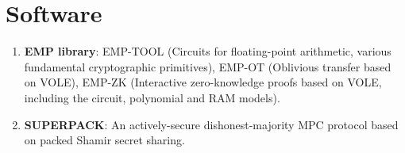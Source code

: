 \documentclass[letterpaper,11pt]{article}
\begin{document}
\section{Software}
 \begin{enumerate}[leftmargin=0.15in, label={}]
   \item \textbf{EMP library}: EMP-TOOL (Circuits for floating-point arithmetic, various fundamental cryptographic primitives), EMP-OT (Oblivious transfer based on VOLE), EMP-ZK (Interactive zero-knowledge proofs based on VOLE, including the circuit, polynomial and RAM models).
   \item \textbf{SUPERPACK}: An actively-secure dishonest-majority MPC protocol based on packed Shamir secret sharing.
 \end{enumerate}


\end{document}
